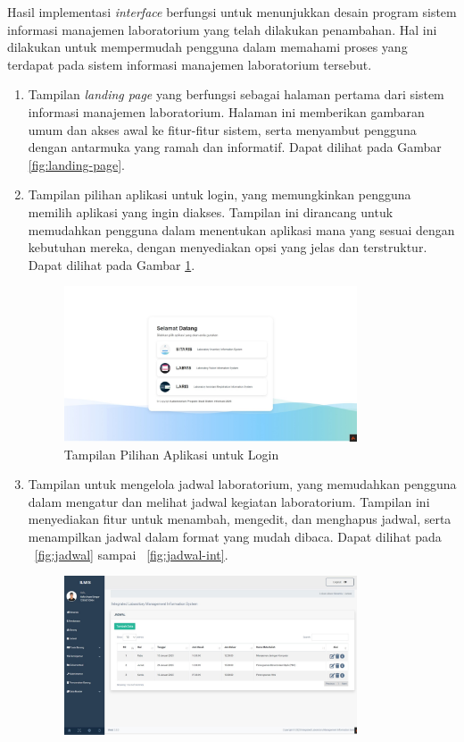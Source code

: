 Hasil implementasi \textit{interface} berfungsi untuk menunjukkan desain program sistem informasi manajemen laboratorium yang telah dilakukan penambahan. Hal ini dilakukan untuk mempermudah pengguna dalam memahami proses yang terdapat pada sistem informasi manajemen laboratorium tersebut.

\begin{enumerate}
	\item Tampilan \textit{landing page} yang berfungsi sebagai halaman pertama dari sistem informasi manajemen laboratorium. Halaman ini memberikan gambaran umum dan akses awal ke fitur-fitur sistem, serta menyambut pengguna dengan antarmuka yang ramah dan informatif. Dapat dilihat pada Gambar \ref{fig:landing-page}.

	\item Tampilan pilihan aplikasi untuk login, yang memungkinkan pengguna memilih aplikasi yang ingin diakses. Tampilan ini dirancang untuk memudahkan pengguna dalam menentukan aplikasi mana yang sesuai dengan kebutuhan mereka, dengan menyediakan opsi yang jelas dan terstruktur. Dapat dilihat pada Gambar \ref{fig:pilih-login}.
	      \begin{figure}
		      \centering
		      \includegraphics[width=0.82\textwidth]{konten/gambar/hasil/pilih-aplikasi.jpeg}
		      \caption{Tampilan Pilihan Aplikasi untuk Login}
		      \label{fig:pilih-login}
	      \end{figure}
	\item Tampilan untuk mengelola jadwal laboratorium, yang memudahkan pengguna dalam mengatur dan melihat jadwal kegiatan laboratorium. Tampilan ini menyediakan fitur untuk menambah, mengedit, dan menghapus jadwal, serta menampilkan jadwal dalam format yang mudah dibaca. Dapat dilihat pada \pic~\ref{fig:jadwal} sampai \pic~\ref{fig:jadwal-int}.
	      \begin{figure}
		      \centering
		      \includegraphics[width=0.82\textwidth]{konten/gambar/hasil/jadwal.jpeg}

\end{figure}
\end{enumerate}
